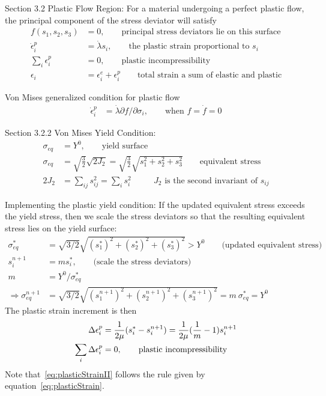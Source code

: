 Section 3.2 Plastic Flow Region: 
For a material undergoing a perfect plastic flow, the principal component of the stress deviator
will satisfy 
\begin{align}
  f(s_1,s_2,s_3) &=0 , \qquad \text{principal stress deviators lie on this surface} \\
  \dot{\epsilon}^p_i &= \dot{\lambda} s_i  , \qquad \text{the plastic strain proportional to $s_i$} \label{eq:plasticStrain} \\
  \sum_i \epsilon^p_i &=0, \qquad \text{plastic incompressibility} \\
  \epsilon_i &= \epsilon^e_i + \epsilon^p_i  \qquad \text{total strain a sum of elastic and plastic} 
\end{align}


Von Mises generalized condition for plastic flow
\begin{align*}
  \dot{\epsilon}^p_i &= \dot{\lambda} \partial f/\partial \sigma_i  , \qquad \text{when $f=\dot{f}=0$} 
\end{align*}

Section 3.2.2 Von Mises Yield Condition: 
\begin{align*}
  \sigma_{eq} &= Y^0 , \qquad \text{yield surface}\\
  \sigma_{eq} &= \sqrt{\frac{3}{2}}\sqrt{ 2J_2 } = \sqrt{\frac{3}{2}}\sqrt{s_1^2 + s_2^2 + s_3^2 } \qquad \text{equivalent stress}\\
  2 J_2 &= \sum_{ij} s_{ij}^2  = \sum_i s_i^2 \qquad \text{ $J_2$ is the second invariant of $s_{ij}$} 
\end{align*}

Implementing the plastic yield condition: If the updated equivalent stress exceeds the yield stress, then
we scale the stress deviators so that the resulting equivalent stress lies on the yield surface: 
\begin{align*}
    \sigma_{eq}^* &=\sqrt{3/2}\sqrt{ (s_1^*)^2+(s_2^*)^2+(s_3^*)^2 } > Y^0  \qquad \text{(updated equivalent stress)}\\
    s_i^{n+1} &= m s_i^* , \qquad \text{(scale the stress deviators)} \\ 
     m&= Y^0/ \sigma_{eq}^* \\
 \Rightarrow \sigma_{eq}^{n+1} &= \sqrt{3/2}\sqrt{ (s_1^{n+1})^2+(s_2^{n+1})^2+(s_3^{n+1})^2 } 
              = m~\sigma_{eq}^* = Y^0 
\end{align*}
The plastic strain increment is then 
\begin{align}
  \Delta\epsilon^p_i &= {1\over 2\mu}( s_i^* -  s_i^{n+1}) = {1\over 2\mu} ({1\over m}-1) s_i^{n+1} 
       \label{eq:plasticStrainII} \\
   \sum_i \Delta\epsilon^p_i &= 0  , \qquad \text{plastic incompressibility}
\end{align}
Note that~\eqref{eq:plasticStrainII} follows the rule given by equation~\eqref{eq:plasticStrain}. 


